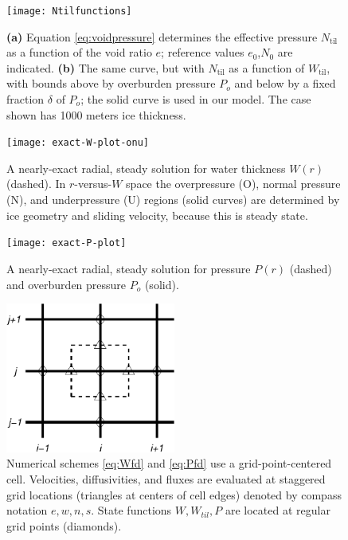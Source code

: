 \documentclass[gmd]{copernicus}   %
\newcommand{\text}{\textrm}
\newcommand{\Ntil}{N_{\text{til}}}
\newcommand{\Wtil}{W_{\text{til}}}
\begin{document}

\begin{figure}[ht]
\texttt{[image: Ntilfunctions]}
\caption{\textbf{(a)} Equation \eqref{eq:voidpressure} determines the effective pressure $\Ntil$ as a function of the void ratio $e$; reference values $e_0$,$N_0$ are indicated.  \textbf{(b)}  The same curve, but with $\Ntil$ as a function of $\Wtil$, with bounds above by overburden pressure $P_o$ and below by a fixed fraction $\delta$ of $P_o$; the solid curve is used in our model.  The case shown has 1000 meters ice thickness.}
\label{fig:Ntilfunctions}
\end{figure}

\begin{figure}[ht]
\texttt{[image: exact-W-plot-onu]}
\caption{A nearly-exact radial, steady solution for water thickness $W(r)$ (dashed).  In $r$-versus-$W$ space the overpressure (O), normal pressure (N), and underpressure (U) regions (solid curves) are determined by ice geometry and sliding velocity, because this is steady state.}
\label{fig:Wexact}
\end{figure}

\begin{figure}[ht]
\texttt{[image: exact-P-plot]}
\caption{A nearly-exact radial, steady solution for pressure $P(r)$ (dashed) and overburden pressure $P_o$ (solid).}
\label{fig:Pexact}
\end{figure}

\begin{figure}[ht]
\centering
\includegraphics[width=2.2in,keepaspectratio=true]{diffstencil}
\bigskip
\caption{Numerical schemes \eqref{eq:Wfd} and \eqref{eq:Pfd} use a grid-point-centered cell.  Velocities, diffusivities, and fluxes are evaluated at staggered grid locations (triangles at centers of cell edges) denoted by compass notation $e,w,n,s$.  State functions $W,W_{til},P$ are located at regular grid points (diamonds).}
\label{fig:stencil}
\end{figure}
\end{document}

